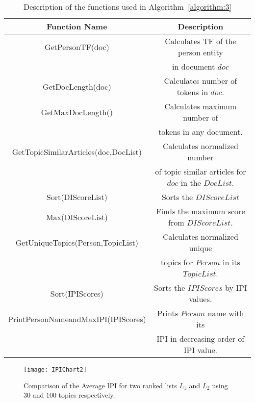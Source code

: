 \begin{table*}
\caption{Description of the functions used in Algorithm~\ref{algorithm:3}}
\label{default}
\begin{center}
\begin{tabular}{|c|c|} \hline
Function Name & Description \\ \hline
GetPersonTF(doc) & Calculates TF of the person entity \\
 & in document $doc$ \\ \hline
GetDocLength(doc) & Calculates number of tokens in $doc$. \\ \hline
GetMaxDocLength() & Calculates maximum number of \\
& tokens in any document.\\ \hline
GetTopicSimilarArticles(doc,DocList) &  Calculates normalized number \\
& of topic similar articles for $doc$ in the $DocList$. \\ \hline
Sort(DIScoreList) & Sorts the $DIScoreList$ \\ \hline
Max(DIScoreList) & Finds the maximum score from $DIScoreList$. \\ \hline
GetUniqueTopics(Person,TopicList) & Calculates normalized unique \\
& topics for $Person$ in its $TopicList$. \\ \hline
Sort(IPIScores) & Sorts the $IPIScores$ by IPI values. \\ \hline
PrintPersonNameandMaxIPI(IPIScores) & Prints $Person$ name with its \\
& IPI in decreasing order of IPI value. \\ \hline
\end{tabular}
\end{center}
\vspace{-10pt}
\end{table*}%

\begin{figure}
\begin{center}
\texttt{[image: IPIChart2]}
\end{center}
\caption{Comparison of the Average IPI for two ranked lists $L_1$ and $L_2$ using $30$ and $100$ topics respectively.}
\label{figure:IPI}
\vspace{-10pt}
\end{figure}